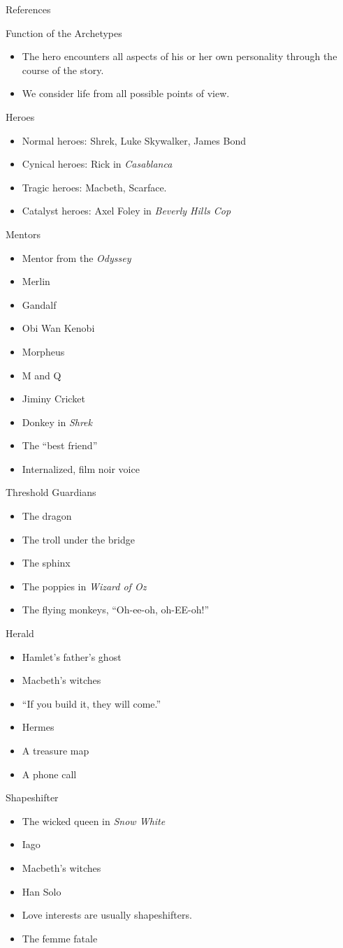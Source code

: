 \documentclass[a4paper,azure,pdf,colorBG,slideColor]{prosper}
\newcommand{\ns}[1]{\vfill \end{slide}\begin{slide}{#1}}
\newcommand{\bi}{\begin{itemize}}
\newcommand{\ei}{\end{itemize}}
\begin{document}
\begin{slide}{References}
\ns{Function of the Archetypes}

\bi
\item
The hero encounters all aspects of his or her own personality
through the course of the story.
\item
We consider life from all possible points of view.
\ei

\ns{Heroes}
\bi
\item Normal heroes: Shrek, Luke Skywalker, James Bond
\item Cynical heroes: Rick in {\em Casablanca}
\item Tragic heroes: Macbeth, Scarface.
\item Catalyst heroes: Axel Foley in {\em Beverly Hills Cop}
\ei 

\ns{Mentors}
\bi
\item Mentor from the {\em Odyssey}
\item Merlin
\item Gandalf
\item Obi Wan Kenobi
\item Morpheus
\item M and Q
\item Jiminy Cricket
\item Donkey in {\em Shrek}
\item The ``best friend''
\item Internalized, film noir voice
\ei

\ns{Threshold Guardians}
\bi
\item The dragon
\item The troll under the bridge
\item The sphinx
\item The poppies in {\em Wizard of Oz}
\item The flying monkeys, ``Oh-ee-oh, oh-EE-oh!''
\ei

\ns{Herald}
\bi
\item Hamlet's father's ghost
\item Macbeth's witches
\item ``If you build it, they will come.''
\item Hermes
\item A treasure map
\item A phone call
\ei

\ns{Shapeshifter}
\bi
\item The wicked queen in {\em Snow White}
\item Iago
\item Macbeth's witches
\item Han Solo
\item Love interests are usually shapeshifters.
\item The femme fatale
\ei


\end{slide}
\end{document}
